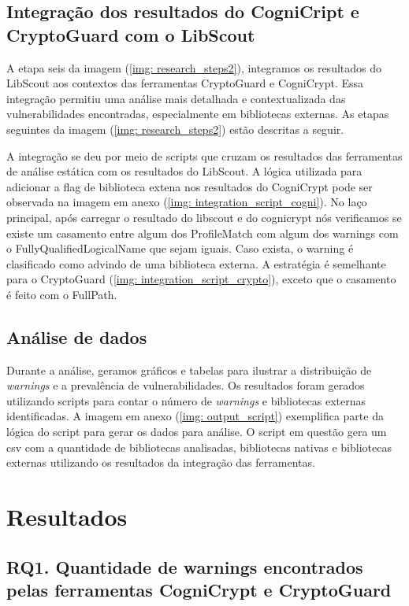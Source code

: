 \subsection{Integração dos resultados do CogniCript e CryptoGuard com o LibScout} 
A etapa seis da imagem (\ref{img: research_steps2}), integramos os resultados do LibScout aos contextos das ferramentas CryptoGuard e CogniCrypt. Essa integração permitiu uma análise mais detalhada e contextualizada das vulnerabilidades encontradas, especialmente em bibliotecas externas. As etapas seguintes da imagem (\ref{img: research_steps2}) estão descritas a seguir.

A integração se deu por meio de scripts que cruzam os resultados das ferramentas de análise estática com os resultados do LibScout. A lógica utilizada para adicionar a flag de biblioteca extena nos resultados do CogniCrypt pode ser observada na imagem em anexo (\ref{img: integration_script_cogni}). No laço principal, após carregar o resultado do libscout e do cognicrypt nós verificamos se existe um casamento entre algum dos ProfileMatch com algum dos warnings com o FullyQualifiedLogicalName que sejam iguais. Caso exista, o warning é clasificado como advindo de uma biblioteca externa. A estratégia é semelhante para o CryptoGuard (\ref{img: integration_script_crypto}), exceto que o casamento é feito com o FullPath. 

\subsection{Análise de dados} 

Durante a análise, geramos gráficos e tabelas para ilustrar a distribuição de \textit{warnings} e a prevalência de vulnerabilidades. Os resultados foram gerados utilizando scripts para contar o número de \textit{warnings} e bibliotecas externas identificadas. A imagem em anexo (\ref{img: output_script}) exemplifica parte da lógica do script para gerar os dados para análise. O script em questão gera um csv com a quantidade de bibliotecas analisadas, bibliotecas nativas e bibliotecas externas utilizando os resultados da integração das ferramentas.


\section{Resultados}

\subsection{RQ1. Quantidade de warnings encontrados pelas ferramentas CogniCrypt e CryptoGuard}

